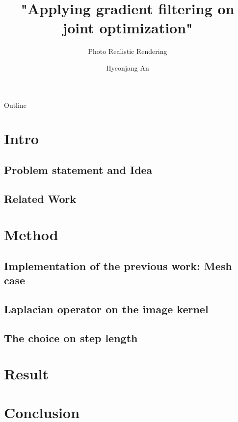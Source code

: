 \documentclass[aspectratio=169]{beamer}
\title{"Applying gradient filtering on joint optimization"}
\subtitle{Photo Realistic Rendering}
\author{Hyeonjang An}
\institute{
    GIST
}
\begin{document}
\begin{frame}
\titlepage

\end{frame}

\begin{frame}{Outline}
    \tableofcontents
\end{frame}

\section{Intro}
    \subsection{Problem statement and Idea}
    \subsection{Related Work}
\section{Method}
    \subsection{Implementation of the previous work: Mesh case}
    \subsection{Laplacian operator on the image kernel}
    \subsection{The choice on step length}
\section{Result}
\section{Conclusion}












\end{document}
